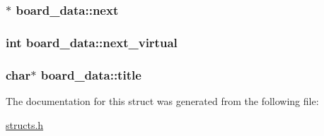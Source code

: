 \hypertarget{structboard__data_a634ec853521e8005a4a26ed28c03d63c}{
\subsubsection[{next}]{$\ast$ board\-\_\-data\-::next}}\label{structboard__data_a634ec853521e8005a4a26ed28c03d63c}
\hypertarget{structboard__data_afc9080edbaa8808d37f5e2aed71c2518}{
\subsubsection[{next\-\_\-virtual}]{\setlength{\rightskip}{0pt plus 5cm}int board\-\_\-data\-::next\-\_\-virtual}}\label{structboard__data_afc9080edbaa8808d37f5e2aed71c2518}
\hypertarget{structboard__data_ad4dcb58b875506d846b7b2f912bc7714}{
\subsubsection[{title}]{\setlength{\rightskip}{0pt plus 5cm}char$\ast$ board\-\_\-data\-::title}}\label{structboard__data_ad4dcb58b875506d846b7b2f912bc7714}


The documentation for this struct was generated from the following file\-:\begin{DoxyCompactItemize}
\item 
\hyperlink{structs_8h}{structs.\-h}\end{DoxyCompactItemize}
